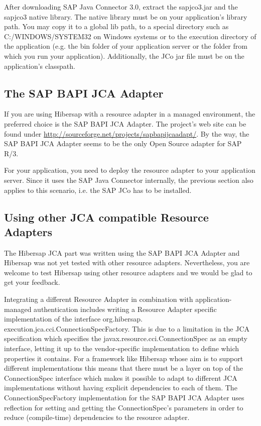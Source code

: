 After downloading SAP Java Connector 3.0, extract the sapjco3.jar and the sapjco3 native library. The native library must be on your application's library path. You may copy it to a global lib path, to a special directory such as C:/WINDOWS/SYSTEM32 on Windows systems or to the execution directory of the application (e.g. the bin folder of your application server or the folder from which you run your application). Additionally, the JCo jar file must be on the application's classpath. 

\subsection{The SAP BAPI JCA Adapter}
If you are using Hibersap with a resource adapter in a managed environment, the preferred choice is the SAP BAPI JCA Adapter. The project's web site can be found under \url{http://sourceforge.net/projects/sapbapijcaadapt/}. By the way, the SAP BAPI JCA Adapter seems to be the only Open Source adapter for SAP R/3.

For your application, you need to deploy the resource adapter to your application server. Since it uses the SAP Java Connector internally, the previous section also applies to this scenario, i.e. the SAP JCo has to be installed. 

\subsection{Using other JCA compatible Resource Adapters}
The Hibersap JCA part was written using the SAP BAPI JCA Adapter and Hibersap was not yet tested with other resource adapters. Nevertheless, you are welcome to test Hibersap using other resource adapters and we would be glad to get your feedback. 

Integrating a different Resource Adapter in combination with application-managed authentication includes writing a Resource Adapter specific implementation of the interface org.hibersap. execution.jca.cci.ConnectionSpecFactory. This is due to a limitation in the JCA specification which specifies the javax.resource.cci.ConnectionSpec as an empty interface, letting it up to the vendor-specific implementation to define which properties it contains. For a framework like Hibersap whose aim is to support different implementations this means that there must be a layer on top of the ConnectionSpec interface which makes it possible to adapt to different JCA implementations without having explicit dependencies to each of them. The ConnectionSpecFactory implementation for the SAP BAPI JCA Adapter uses reflection for setting and getting the ConnectionSpec's parameters in order to reduce (compile-time) dependencies to the resource adapter.

